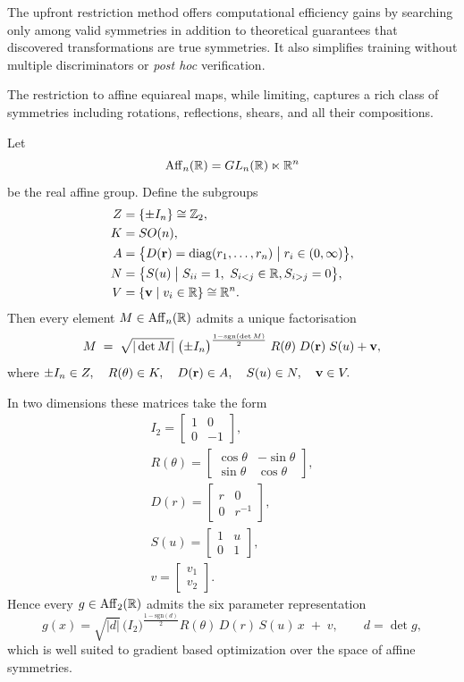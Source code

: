     The upfront restriction method offers computational efficiency gains by searching only among valid symmetries in addition to theoretical guarantees that discovered transformations are true symmetries.
    It also simplifies training without multiple discriminators or \textit{post hoc} verification.

    The restriction to affine equiareal maps, while limiting, captures a rich class of symmetries including rotations, reflections, shears, and all their compositions.
\begin{theorem}
\label{thm:iwasawa_affine}
Let 
\[
    \operatorname{Aff}_n(\mathbb{R})= GL_n(\mathbb{R})\ltimes\mathbb{R}^n
\]
be the real affine group.  Define the subgroups
\[
\begin{aligned}
Z &= \{\pm I_n\}\cong \mathbb{Z}_2,\\
K &= SO(n),\\
A &= \bigl\{D(\vb r)=\operatorname{diag}(r_1,\dots,r_n)\;\big|\;r_i\in(0,\infty)\bigr\},\\
N &= \bigl\{S(u) \;\big|\;S_{ii}=1,\ S_{i < j}\in\mathbb{R}, S_{i>j}=0\bigr\},\\
V &= \qty{\vb v \mid v_i\in\mathbb{R}}\cong\mathbb{R}^n.
\end{aligned}
\]
Then every element $M\in\operatorname{Aff}_n(\mathbb{R})$ admits a unique factorisation
\[
M \;=\;
\sqrt{|\det M|}\;\bigl(\pm I_n\bigr)^{\frac{1-\text{sgn}(\det M)}{2}}
\;R(\vb\theta)\;D(\vb r)\;S(u) + \vb v,
\]
where
\(
\pm I_n\in Z,\quad R(\vb\theta)\in K,\quad D(\vb r)\in A,\quad S(u)\in N,\quad \vb v\in V.
\)
\end{theorem}
In two dimensions these matrices take the form
\begin{gather}
I_2=\begin{bmatrix}1&0\\0&-1\end{bmatrix},\\
R(\theta)=\begin{bmatrix}\cos\theta & -\sin\theta\\
\sin\theta & \cos\theta\end{bmatrix},\\
D(r)=\begin{bmatrix}r & 0\\0 & r^{-1}\end{bmatrix},\\
S(u)=\begin{bmatrix}1 & u\\0 & 1\end{bmatrix},\\
v=\begin{bmatrix}v_1\\v_2\end{bmatrix}.
\end{gather}
Hence every $g\in\operatorname{Aff}_2(\mathbb{R})$ admits the six parameter representation
\[
g(x)=\sqrt{|d|}\,\bigl(I_2\bigr)^{\frac{1-\text{sgn}(d)}{2}}
R(\theta)\,D(r)\,S(u)\,x \;+\;v,
\qquad d=\det g,
\]
which is well suited to gradient based optimization over the space of affine symmetries.

